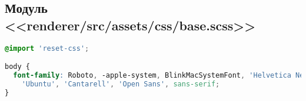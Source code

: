 \subsection{Модуль <<renderer/src/assets/css/base.scss>>}
\begin{lstlisting}[language=scss]
@import 'reset-css';

body {
  font-family: Roboto, -apple-system, BlinkMacSystemFont, 'Helvetica Neue', 'Segoe UI', 'Oxygen',
    'Ubuntu', 'Cantarell', 'Open Sans', sans-serif;
}
\end{lstlisting}
